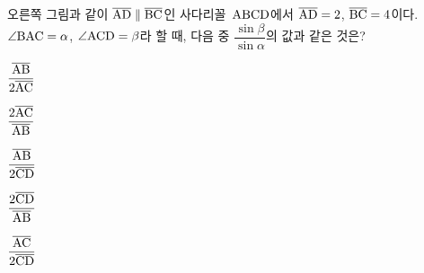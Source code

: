 \noindent\begin{minipage}[t]{0.58\linewidth}\vspace{0pt}\raggedright 오른쪽 그림과 같이 $\overline{\mathrm{AD}}\parallel\overline{\mathrm{BC}}$인 사다리꼴~$\mathrm{ABCD}$에서 $\overline{\mathrm{AD}}=2$, $\overline{\mathrm{BC}}=4$이다. $\angle\mathrm{BAC}=\alpha$, $\angle\mathrm{ACD}=\beta$라 할 때, 다음 중 $\dfrac{\sin\beta}{\sin\alpha}$의 값과 같은 것은?\end{minipage}\hfill\begin{minipage}[t]{0.4\linewidth}\vspace{0pt}\centering \resizebox{\ifdim\width>\linewidth\linewidth\else\width\fi}{!}{}\end{minipage}\par
\begin{choices32}{\rule[-3ex]{0pt}{8ex}$\dfrac{\overline{\mathrm{AB}}}{2\overline{\mathrm{AC}}}$}{\rule[-3ex]{0pt}{8ex}$\dfrac{2\overline{\mathrm{AC}}}{\overline{\mathrm{AB}}}$}{\rule[-3ex]{0pt}{8ex}$\dfrac{\overline{\mathrm{AB}}}{2\overline{\mathrm{CD}}}$}{\rule[-3ex]{0pt}{8ex}$\dfrac{2\overline{\mathrm{CD}}}{\overline{\mathrm{AB}}}$}{\rule[-3ex]{0pt}{8ex}$\dfrac{\overline{\mathrm{AC}}}{2\overline{\mathrm{CD}}}$}\end{choices32}
